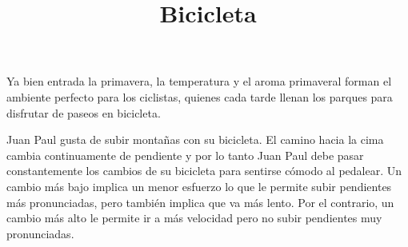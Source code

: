 \documentclass{oci}
\title{Bicicleta}
\begin{document}
\begin{problemDescription}
Ya bien entrada la primavera, la temperatura y el aroma primaveral forman el
ambiente perfecto para los ciclistas, quienes cada tarde llenan los parques para
disfrutar de paseos en bicicleta. %



Juan Paul gusta de subir montañas con su bicicleta.
El camino hacia la cima cambia continuamente
de pendiente y por lo tanto Juan Paul debe pasar constantemente los cambios de su bicicleta para sentirse
cómodo al pedalear. 
Un cambio más bajo implica un menor esfuerzo lo que le permite subir pendientes
más pronunciadas,
pero también implica que va más lento.
Por el contrario, un cambio más alto le permite ir a más velocidad pero no subir
pendientes muy pronunciadas. 






\end{problemDescription}
\end{document}
